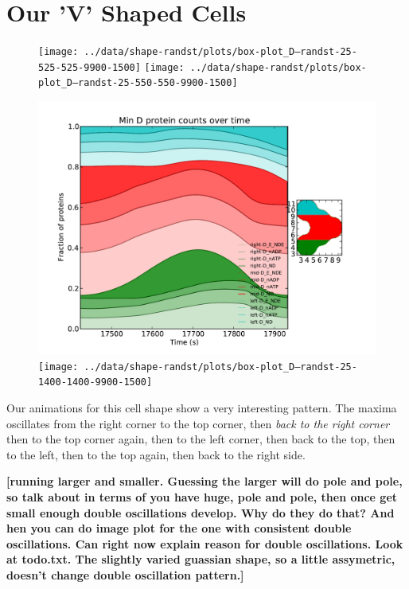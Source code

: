 \documentclass[letterpaper,twocolumn,amsmath,amssymb,pre]{revtex4-1}
\newcommand{\red}[1]{{\bf \color{red} #1}}
\newcommand{\fixme}[1]{\red{[#1]}}
\begin{document}
\section{Our 'V' Shaped Cells}
\begin{figure}
  \texttt{[image: ../data/shape-randst/plots/box-plot\_D--randst-25-525-525-9900-1500]}
  \texttt{[image: ../data/shape-randst/plots/box-plot\_D--randst-25-550-550-9900-1500]}
\end{figure}
\begin{figure}
  \includegraphics[width=\columnwidth]{../data/shape-randst/plots/box-plot_D--randst-25-600-600-9900-1500}
  \texttt{[image: ../data/shape-randst/plots/box-plot\_D--randst-25-1400-1400-9900-1500]}
\end{figure}

Our animations for this cell shape show a very interesting pattern.
The maxima oscillates from the right corner to the top corner, then
\emph{back to the right corner} then to the top corner again, then to
the left corner, then back to the top, then to the left, then to the
top again, then back to the right side.

\fixme{running larger and smaller.  Guessing the larger will do pole
  and pole, so talk about in terms of you have huge, pole and pole,
  then once get small enough double oscillations develop.  Why do they
  do that?  And hen you can do image plot for the one with consistent
  double oscillations.  Can right now explain reason for double
  oscillations.  Look at todo.txt.  The slightly varied guassian shape,
  so a little assymetric, doesn't change double oscillation pattern.}
\end{document}
